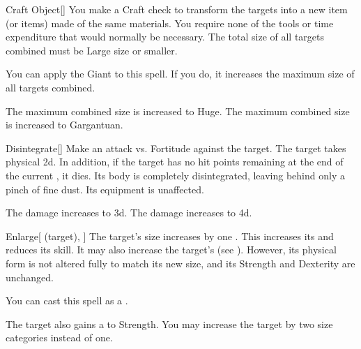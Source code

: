 \lowercase{\hypertarget{spell:Craft Object}{}}\label{spell:Craft Object}
\begin{freeability}[Rank 4]{\hypertarget{spell:Craft Object}{Craft Object}}[]
You make a Craft check to transform the targets into a new item (or items) made of the same materials.
You require none of the tools or time expenditure that would normally be necessary.
The total size of all targets combined must be Large size or smaller.

You can apply the Giant  to this spell.
If you do, it increases the maximum size of all targets combined.

\rankline
{} The maximum combined size is increased to Huge.
 The maximum combined size is increased to Gargantuan.
\end{freeability}
\vspace{0.25em}



\lowercase{\hypertarget{spell:Disintegrate}{}}\label{spell:Disintegrate}
\begin{freeability}[Rank 4]{\hypertarget{spell:Disintegrate}{Disintegrate}}[]
Make an attack vs. Fortitude against the target.
\hit The target takes physical  \plus2d.
In addition, if the target has no hit points remaining at the end of the current , it dies.
Its body is completely disintegrated, leaving behind only a pinch of fine dust.
Its equipment is unaffected.

\rankline
{} The damage increases to  \plus3d.
 The damage increases to  \plus4d.
\end{freeability}
\vspace{0.25em}



\lowercase{\hypertarget{spell:Enlarge}{}}\label{spell:Enlarge}
\begin{attuneability}[Rank 4]{\hypertarget{spell:Enlarge}{Enlarge}}[ (target), ]
The target's size increases by one .
This increases its  and reduces its  skill.
It may also increase the target's  (see ).
However, its physical form is not altered fully to match its new size, and its Strength and Dexterity are unchanged.

You can cast this spell as a .

\rankline
{} The target also gains a   to Strength.
 You may increase the target by two size categories instead of one.
\end{attuneability}
\vspace{0.25em}



